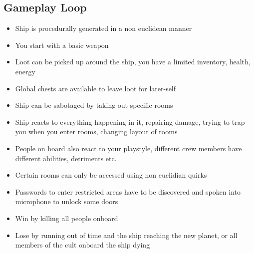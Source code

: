 \documentclass[a4paper]{article} %
\begin{document}
\subsection*{Gameplay Loop}
\begin{itemize}
    \item Ship is procedurally generated in a non euclidean manner
    \item You start with a basic weapon
    \item Loot can be picked up around the ship, you have a limited inventory, health, energy
    \item Global chests are available to leave loot for later-self
    \item Ship can be sabotaged by taking out specific rooms
    \item Ship reacts to everything happening in it, repairing damage, trying to trap you when you enter rooms, changing layout of rooms
    \item People on board also react to your playstyle, different crew members have different abilities, detriments etc.
    \item Certain rooms can only be accessed using non euclidian quirks
    \item Passwords to enter restricted areas have to be discovered and spoken into microphone to unlock some doors
    \item Win by killing all people onboard
    \item Lose by running out of time and the ship reaching the new planet, or all members of the cult onboard the ship dying
    
\end{itemize}
\ifdefined\booklet
\else
\end{document}
